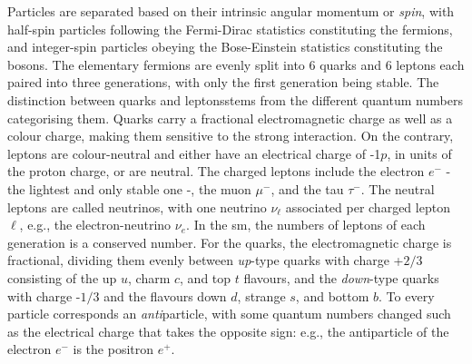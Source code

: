 Particles are separated based on their intrinsic angular momentum or \textit{spin}, with half-spin particles following the Fermi-Dirac statistics constituting the fermions, and integer-spin particles obeying the Bose-Einstein statistics constituting the bosons. The elementary fermions are evenly split into 6 quarks and 6 leptons each paired into three generations, with only the first generation being stable. The distinction between quarks and leptonsstems from the different quantum numbers categorising them. Quarks carry a fractional electromagnetic charge as well as a colour charge, making them sensitive to the strong interaction. On the contrary, leptons are colour-neutral and either have an electrical charge of -1$p$, in units of the proton charge, or are neutral. The charged leptons include the electron $e^-$ - the lightest and only stable one -, the muon $\mu^-$, and the tau $\tau^-$. The neutral leptons are called neutrinos, with one neutrino $\nu_\ell$ associated per charged lepton $\ell$, e.g., the electron-neutrino $\nu_e$. In the \gls{sm}, the numbers of leptons of each generation is a conserved number. For the quarks, the electromagnetic charge is fractional, dividing them evenly between \textit{up}-type quarks with charge +$2/3$ consisting of the up $u$, charm $c$, and top $t$ flavours, and the \textit{down}-type quarks with charge -$1/3$ and the flavours down $d$, strange $s$, and bottom $b$. To every particle corresponds an \textit{anti}particle, with some quantum numbers changed such as the electrical charge that takes the opposite sign: e.g., the antiparticle of the electron $e^-$ is the positron $e^+$. \\

